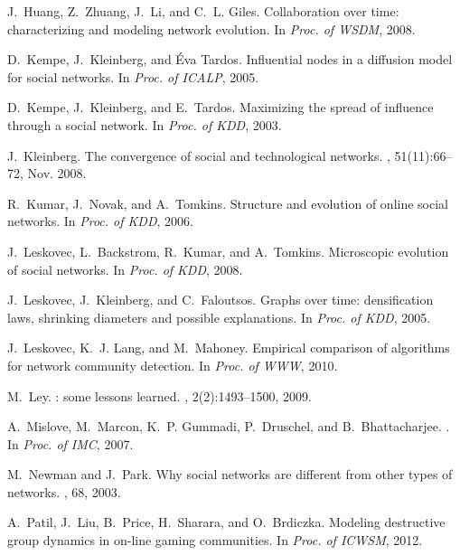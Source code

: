 \documentclass[letterpaper]{www13-companion-accepted}
\begin{document}
{\begin{thebibliography}{10}
J.~Huang, Z.~Zhuang, J.~Li, and C.~L. Giles.
\newblock Collaboration over time: characterizing and modeling network
  evolution.
\newblock In {\em Proc. of WSDM}, 2008.

D.~Kempe, J.~Kleinberg, and \'{E}va Tardos.
\newblock Influential nodes in a diffusion model for social networks.
\newblock In {\em Proc. of ICALP}, 2005.

D.~Kempe, J.~Kleinberg, and E.~Tardos.
\newblock Maximizing the spread of influence through a social network.
\newblock In {\em Proc. of KDD}, 2003.

\vfill\eject

J.~Kleinberg.
\newblock The convergence of social and technological networks.
, 51(11):66--72, Nov. 2008.

R.~Kumar, J.~Novak, and A.~Tomkins.
\newblock Structure and evolution of online social networks.
\newblock In {\em Proc. of KDD}, 2006.

J.~Leskovec, L.~Backstrom, R.~Kumar, and A.~Tomkins.
\newblock Microscopic evolution of social networks.
\newblock In {\em Proc. of KDD}, 2008.

J.~Leskovec, J.~Kleinberg, and C.~Faloutsos.
\newblock Graphs over time: densification laws, shrinking diameters and
  possible explanations.
\newblock In {\em Proc. of KDD}, 2005.

J.~Leskovec, K.~J. Lang, and M.~Mahoney.
\newblock Empirical comparison of algorithms for network community detection.
\newblock In {\em Proc. of WWW}, 2010.

M.~Ley.
: some lessons learned.
, 2(2):1493--1500, 2009.

A.~Mislove, M.~Marcon, K.~P. Gummadi, P.~Druschel, and B.~Bhattacharjee.
.
\newblock In {\em Proc. of IMC}, 2007.

M.~Newman and J.~Park.
\newblock Why social networks are different from other types of networks.
, 68, 2003.

A.~Patil, J.~Liu, B.~Price, H.~Sharara, and O.~Brdiczka.
\newblock Modeling destructive group dynamics in on-line gaming communities.
\newblock In {\em Proc. of ICWSM}, 2012.


\end{thebibliography}}
\end{document}
